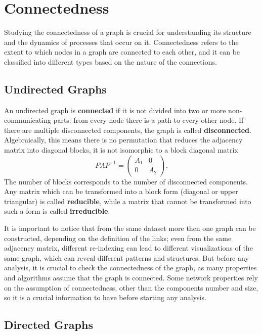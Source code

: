 \section{Connectedness}

Studying the connectedness of a graph is crucial for understanding its structure and the dynamics of processes that occur on it. Connectedness refers to the extent to which nodes in a graph are connected to each other, and it can be classified into different types based on the nature of the connections.

\subsection{Undirected Graphs}
An undirected graph is \textbf{connected} if it is not divided into two or more non-communicating parts: from every node there is a path to every other node. If there are multiple disconnected components, the graph is called \textbf{disconnected}.
Algebraically, this means there is no permutation that reduces the adjacency matrix into diagonal blocks, it is not isomorphic to a block diagonal matrix
\[
    P A P^{-1} = \begin{pmatrix}
        A_1 & 0   \\
        0   & A_2
    \end{pmatrix}.
\]
The number of blocks corresponds to the number of disconnected components. Any matrix which can be transformed into a block form (diagonal or upper triangular) is called \textbf{reducible}, while a matrix that cannot be transformed into such a form is called \textbf{irreducible}.

It is important to notice that from the same dataset more then one graph can be constructed, depending on the definition of the links; even from the same adjacency matrix, different re-indexing can lead to different visualizations of the same graph, which can reveal different patterns and structures. But before any analysis, it is crucial to check the connectedness of the graph, as many properties and algorithms assume that the graph is connected. Some network properties rely on the assumption of connectedness, other than the components number and size, so it is a crucial information to have before starting any analysis.

\subsection{Directed Graphs}


